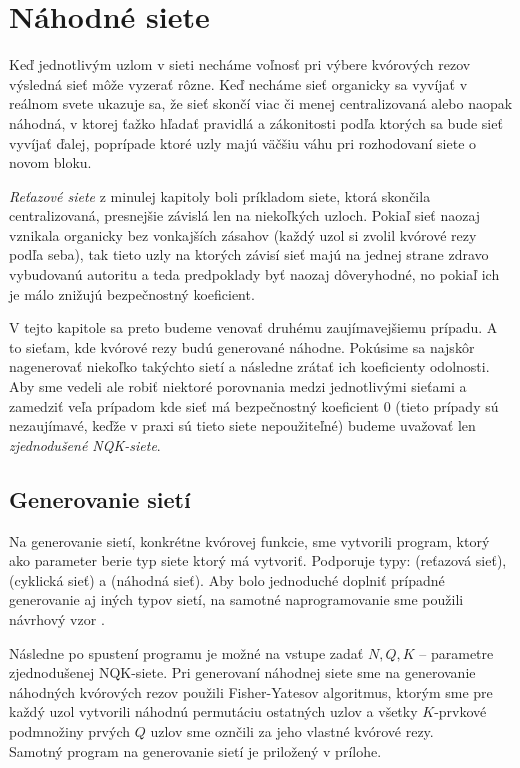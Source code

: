 \chapter {Náhodné siete}

Keď jednotlivým uzlom v sieti necháme voľnosť pri výbere kvórových rezov výsledná
sieť môže vyzerať rôzne. Keď necháme sieť organicky sa vyvíjať v reálnom svete
ukazuje sa, že sieť skončí viac či menej centralizovaná alebo naopak náhodná,
v ktorej ťažko hľadať pravidlá a zákonitosti podľa ktorých sa bude sieť vyvíjať
ďalej, poprípade ktoré uzly majú väčšiu váhu pri rozhodovaní siete o novom bloku.

\textit{Reťazové siete} z minulej kapitoly boli príkladom siete, ktorá skončila
centralizovaná, presnejšie závislá len na niekoľkých uzloch.
Pokiaľ sieť naozaj vznikala organicky bez vonkajších zásahov
(každý uzol si zvolil kvórové rezy podľa seba), tak tieto uzly na ktorých závisí 
sieť majú na jednej strane zdravo vybudovanú autoritu a teda predpoklady byť
naozaj dôveryhodné, no pokiaľ ich je málo znižujú bezpečnostný koeficient.

V tejto kapitole sa preto budeme venovať druhému zaujímavejšiemu prípadu.
A to sieťam, kde kvórové rezy budú generované náhodne. Pokúsime sa najskôr
nagenerovať niekoľko takýchto sietí a následne zrátať ich koeficienty odolnosti.
Aby sme vedeli ale robiť niektoré porovnania medzi jednotlivými sieťami a zamedziť
veľa prípadom kde sieť má bezpečnostný koeficient 0 (tieto prípady sú nezaujímavé,
keďže v praxi sú tieto siete nepoužiteľné) budeme uvažovať len
\textit{zjednodušené NQK-siete}.

\section {Generovanie sietí}

Na generovanie sietí, konkrétne kvórovej funkcie, sme vytvorili program, ktorý ako
parameter berie typ siete ktorý má vytvoriť. Podporuje typy: 
(reťazová sieť),  (cyklická sieť) a  (náhodná sieť).
Aby bolo jednoduché doplniť prípadné generovanie aj iných typov sietí, na samotné
naprogramovanie sme použili návrhový vzor \cite{gamma1995design}.

Následne po spustení programu je možné na vstupe zadať $N, Q, K$ -- parametre
zjednodušenej NQK-siete.
Pri generovaní náhodnej siete sme na generovanie náhodných kvórových rezov použili
Fisher-Yatesov algoritmus\cite{fisher1943statistical}, ktorým sme pre každý uzol
vytvorili náhodnú permutáciu ostatných uzlov a všetky $K$-prvkové podmnožiny
prvých $Q$ uzlov sme oznčili za jeho vlastné kvórové rezy.\\
Samotný program na generovanie sietí je priložený v prílohe.

